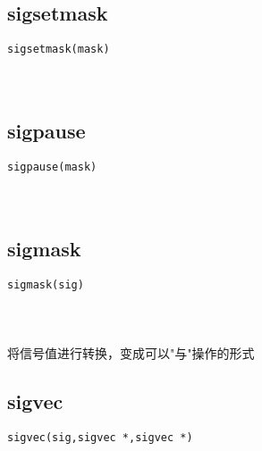 \documentclass[10pt,a4paper]{article}
\begin{document}
\subsection{sigsetmask}
\begin{spacing}{2.0}
\lstset{language=C,numbers=none}
\begin{lstlisting}
sigsetmask(mask)
\end{lstlisting}
{\large\color[rgb]{0.2,0.4,0.6}{mask:}}
\paragraph{ \ \ }
\end{spacing}

\subsection{sigpause}
\begin{spacing}{2.0}
\lstset{language=C,numbers=none}
\begin{lstlisting}
sigpause(mask)
\end{lstlisting}
{\large\color[rgb]{0.2,0.4,0.6}{mask:}}
\paragraph{ \ \ }
\end{spacing}

\subsection{sigmask}
\begin{spacing}{2.0}
\lstset{language=C,numbers=none}
\begin{lstlisting}
sigmask(sig)
\end{lstlisting}
{\large\color[rgb]{0.2,0.4,0.6}{sig:}}
\paragraph{ \ \ }将信号值进行转换，变成可以"与"操作的形式
\end{spacing}

\subsection{sigvec}
\begin{spacing}{2.0}
\lstset{language=C,numbers=none}
\begin{lstlisting}
sigvec(sig,sigvec *,sigvec *)
\end{lstlisting}
{\large\color[rgb]{0.2,0.4,0.6}{sig:}} \\
{\large\color[rgb]{0.2,0.4,0.6}{*:}} \\
{\large\color[rgb]{0.2,0.4,0.6}{*:}}
\paragraph{ \ \ }
\end{spacing}
\end{document}
